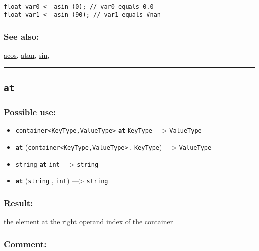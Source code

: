\documentclass[]{book}
\providecommand{\tightlist}{%
  \setlength{\itemsep}{0pt}\setlength{\parskip}{0pt}}
\theoremstyle{definition}
\theoremstyle{definition}
\theoremstyle{definition}
\theoremstyle{remark}
\begin{document}
\begin{verbatim}
 
float var0 <- asin (0); // var0 equals 0.0 
float var1 <- asin (90); // var1 equals #nan
\end{verbatim}

\subsubsection{See also:}\label{see-also-38}

\href{OperatorsAA\#acos}{acos}, \href{OperatorsAA\#atan}{atan},
\href{OperatorsSZ\#sin}{sin},

\begin{center}\rule{0.5\linewidth}{\linethickness}\end{center}

\subsection{\texorpdfstring{\texttt{at}}{at}}\label{at}

\subsubsection{Possible use:}\label{possible-use-56}

\begin{itemize}
\tightlist
\item
  \texttt{container\textless{}KeyType,ValueType\textgreater{}}
  \textbf{\texttt{at}} \texttt{KeyType} ---\textgreater{}
  \texttt{ValueType}
\item
  \textbf{\texttt{at}}
  (\texttt{container\textless{}KeyType,ValueType\textgreater{}} ,
  \texttt{KeyType}) ---\textgreater{} \texttt{ValueType}
\item
  \texttt{string} \textbf{\texttt{at}} \texttt{int} ---\textgreater{}
  \texttt{string}
\item
  \textbf{\texttt{at}} (\texttt{string} , \texttt{int})
  ---\textgreater{} \texttt{string}
\end{itemize}

\subsubsection{Result:}\label{result-55}

the element at the right operand index of the container

\subsubsection{Comment:}\label{comment-13}
\end{document}
